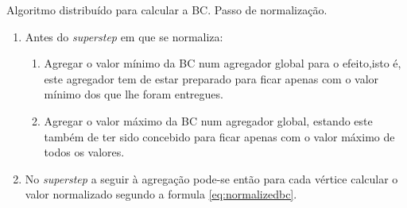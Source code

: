 \begin{algorithm}
  \caption{Algoritmo distribuído para calcular a BC. Passo de normalização.}
  \label{alg:normbc}
  \begin{enumerate} 
    \item Antes do \textit{superstep} em que se normaliza:
    \begin{enumerate}  
      \item Agregar o valor mínimo da BC num agregador global para o 
efeito,isto é, este agregador tem de estar preparado para ficar apenas com o 
valor mínimo dos que lhe foram entregues.
      \item Agregar o valor máximo da BC num agregador global, estando este 
também de ter sido concebido para ficar apenas com o valor máximo de todos os 
valores.
    \end{enumerate}
    \item No \textit{superstep} a seguir à agregação pode-se então para 
cada vértice calcular o valor normalizado segundo a formula 
\ref{eq:normalizedbc}.
  \end{enumerate}
\end{algorithm}



